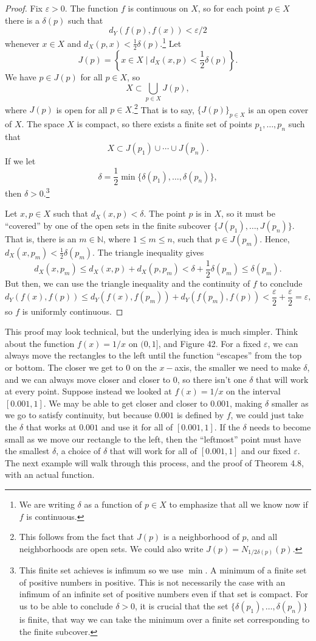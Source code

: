 \documentclass{article}
\newcommand{\N}{\mathbb{N}}
\theoremstyle{definition}
\begin{document}
\begin{proof}
	Fix $ \varepsilon>0 $. The function $ f $ is continuous on $ X $, so for each point $ p\in X $ there is a $ \delta(p) $ such that $$d_Y(f(p),f(x))<\varepsilon/2 $$ whenever $ x\in X $ and $ d_X(p,x)<\frac{1}{2}\delta(p) $.\footnote{We are writing $ \delta $ as a function of $ p\in X $ to emphasize that all we know now if $ f $ is continuous.} Let $$ J(p)=\left\{x\in X \mid d_X(x,p)<\frac{1}{2}\delta(p)\right\} .$$ We have $ p\in J(p) $ for all $ p\in X $, so $$X\subset\bigcup_{p\in X}J(p),$$ where $ J(p) $ is open for all $ p\in X $.\footnote{This follows from the fact that $ J(p) $ is a neighborhood of $ p $, and all neighborhoods are open sets. We could also write $ J(p)=N_{1/2\delta(p)}(p) $.} That is to say, $ \{J(p)\}_{p\in X} $ is an open cover of $ X $. The space $ X $ is compact, so there exists a finite set of points $ p_1,\ldots,p_n $ such that $$ X\subset J(p_1)\cup\cdots\cup J(p_n).$$ If we let $$ \delta=\frac{1}{2}\min\{\delta(p_1),\ldots,\delta(p_n)\},$$ then $ \delta>0 $.\footnote{This finite set achieves is infimum so we use $ \min $. A minimum of a finite set of positive numbers in positive. This is not necessarily the case with an infimum of an infinite set of positive numbers even if that set is compact. For us to be able to conclude $ \delta>0 $, it is crucial that the set $ \{\delta(p_1),\ldots,\delta(p_n)\} $ is finite, that way we can take the minimum over a finite set corresponding to the finite subcover. }
	
	Let $ x,p\in X $ such that $ d_X(x,p)<\delta $. The point $ p $ is in $ X $, so it must be ``covered'' by one of the open sets in the finite subcover $ \{J(p_1),\ldots,J(p_n)\} $. That is, there is an $ m\in\N $, where $ 1\le m\le n $, such that $ p\in J(p_m) $. Hence, $d_X(x,p_m)<\frac{1}{2}\delta(p_m) $. The triangle inequality gives $$d_X(x,p_m)\le d_X(x,p)+d_X(p,p_m)<\delta+\frac{1}{2}\delta(p_m)\le\delta(p_m) .$$ But then, we can use the triangle inequality and the continuity of $ f $ to conclude $$d_Y(f(x),f(p))\le d_Y(f(x),f(p_m))+d_Y(f(p_m),f(p))<\frac{\varepsilon}{2}+\frac{\varepsilon}{2}=\varepsilon ,$$ so $ f $ is uniformly continuous.
\end{proof}
This proof may look technical, but the underlying idea is much simpler. Think about the function $ f(x)=1/x $ on $ (0,1] $, and Figure 42. For a fixed $ \varepsilon $, we can always move the rectangles to the left until the function ``escapes'' from the top or bottom. The closer we get to $ 0 $ on the $ x -$axis, the smaller we need to make $ \delta $, and we can always move closer and closer to $ 0 $, so there isn't one $ \delta $ that will work at every point. Suppose instead we looked at $ f(x)=1/x $ on the interval $ [0.001,1] $. We may be able to get closer and closer to $ 0.001 $, making $ \delta $ smaller as we go to satisfy continuity, but because $ 0.001 $ is defined by $ f $, we could just take the $ \delta $ that works at $ 0.001 $ and use it for all of $ [0.001,1] $. If the $ \delta $ needs to become small as we move our rectangle to the left, then the ``leftmost'' point must have the smallest $ \delta $, a choice of $ \delta $ that will work for all of $ [0.001,1] $ and our fixed $ \varepsilon $. The next example will walk through this process, and the proof of Theorem 4.8, with an actual function. 
\end{document}
